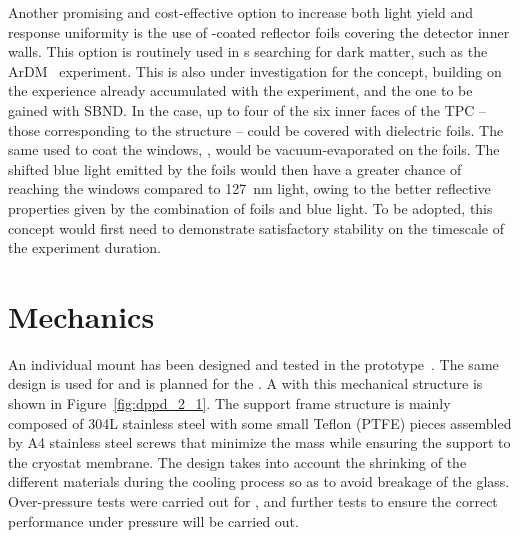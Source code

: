 Another promising and cost-effective option to increase both light yield and response uniformity is the use of -coated reflector foils covering the detector inner walls. This option is routinely used in \dual \lartpc{}s searching for dark matter, such as the ArDM~\cite{Boccone:2009zz} experiment. 
This is also under investigation for the  concept, building on the experience already accumulated with the \lariat experiment, and the one to be gained with SBND. In the \dual case, up to four of the six inner faces of the TPC -- those corresponding to the  structure -- could be covered with dielectric foils. The same  used to coat the  windows, , would be vacuum-evaporated on the foils. The shifted blue light emitted by the foils would then have a greater chance of reaching the  windows compared to \SI{127}{nm} light, owing to the better reflective properties given by the combination of foils and blue light. To be adopted, %
this concept would first need to demonstrate satisfactory stability on the timescale of the experiment duration.

\section{Mechanics}
\label{sec:fddp-pd-3}


An individual  mount has been designed and tested in the   %
prototype~\cite{Zambelli:2017dkg}. The same design is used for  and is planned %
for the . A  with this mechanical structure is shown in Figure~\ref{fig:dppd_2_1}. The support frame structure is mainly composed of \num{304}L stainless steel with some small Teflon (PTFE) pieces assembled by A4 stainless steel screws that minimize the mass while ensuring the  support to the cryostat membrane. The design %
takes into account the shrinking of the different materials during the cooling process so as to avoid breakage of the  glass.
Over-pressure tests were carried out for , and further tests to ensure the correct performance under pressure will be carried out.

